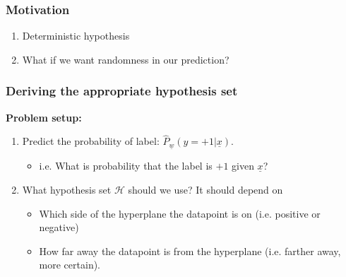     \subsubsection{Motivation}
    \begin{example}
        \begin{enumerate}
            \item Deterministic hypothesis

            \item What if we want randomness in our prediction?
        \end{enumerate}    
    \end{example}

    \subsubsection{Deriving the appropriate hypothesis set}
    \begin{derivation}
        \textbf{Problem setup:}
        \begin{enumerate}
            \item Predict the probability of label: $\hat{P}_{\underline{w}} (y = +1| \underline{x})$.
            \begin{itemize}
                \item i.e. What is probability that the label is $+1$ given $\underline{x}$?
            \end{itemize}
            \item What hypothesis set $\mathcal{H}$ should we use? It should depend on 
            \begin{itemize}
                \item Which side of the hyperplane the datapoint is on (i.e. positive or negative)
                \item How far away the datapoint is from the hyperplane (i.e. farther away, more certain).
            \end{itemize}
        \end{enumerate}    

    \end{derivation}

